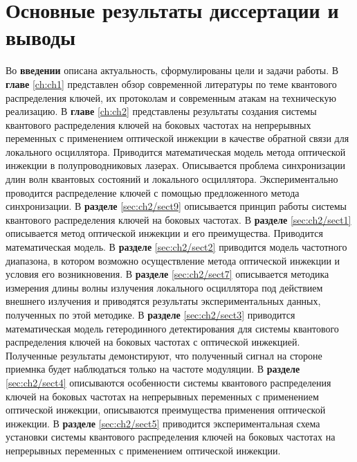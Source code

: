 \section*{Основные результаты диссертации и выводы}
Во \textbf{введении} описана актуальность, сформулированы цели и задачи работы.
\newline В \textbf{главе} \ref{ch:ch1} представлен обзор современной литературы по теме квантового распределения ключей, их протоколам и современным атакам на техническую реализацию.
\newline В \textbf{главе} \ref{ch:ch2} представлены результаты создания системы квантового распределения ключей на боковых частотах на непрерывных переменных с применением оптической инжекции в качестве обратной связи для локального осциллятора. Приводится математическая модель метода оптической инжекции в полупроводниковых лазерах. Описывается проблема синхронизации длин волн квантовых состояний и локального осциллятора. Экспериментально проводится распределение ключей с помощью предложенного метода синхронизации.
\newline В \textbf{разделе} \ref{sec:ch2/sect9} описывается принцип работы системы квантового распределения ключей на боковых частотах.
\newline В \textbf{разделе} \ref{sec:ch2/sect1} описывается метод оптической инжекции и его преимущества. Приводится математическая модель.
\newline В \textbf{разделе} \ref{sec:ch2/sect2} приводится модель частотного диапазона, в котором возможно осуществление метода оптической инжекции и условия его возникновения.
\newline В \textbf{разделе} \ref{sec:ch2/sect7} описывается методика измерения длины волны излучения локального осциллятора под действием внешнего излучения и приводятся результаты экспериментальных данных, полученных по этой методике.
\newline В \textbf{разделе} \ref{sec:ch2/sect3} приводится математическая модель гетеродинного детектирования для системы квантового распределения ключей на боковых частотах с оптической инжекцией. Полученные результаты демонстируют, что полученный сигнал на стороне приемнка будет наблюдаться только на частоте модуляции.
\newline В \textbf{разделе} \ref{sec:ch2/sect4} описываются особенности системы квантового распределения ключей на боковых частотах на непрерывных переменных с применением оптической инжекции, описываются преимущества применения оптической инжекции.
\newline В \textbf{разделе} \ref{sec:ch2/sect5} приводится экспериментальная схема установки системы квантового распределения ключей на боковых частотах на непрерывных переменных с применением оптической инжекции.
